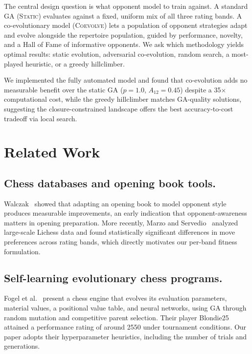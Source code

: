 \documentclass[conference]{IEEEtran}
\begin{document}
    The central design question is what opponent model to train against. A
    standard GA ({\scshape Static}) evaluates against a fixed, uniform mix of
    all three rating bands. A co-evolutionary model ({\scshape Coevolve}) lets
    a population of opponent strategies adapt and evolve alongside the repertoire
    population, guided by performance, novelty, and a Hall of Fame of informative
    opponents. We ask which methodology yields optimal results: static evolution,
    adversarial co-evolution, random search, a most-played heuristic, or a greedy
    hillclimber.

    We implemented the fully automated model and found that
    co-evolution adds no measurable benefit over the static GA ($p = 1.0$,
    $A_{12} = 0.45$) despite a 35$\times$ computational cost, while the greedy
    hillclimber matches GA-quality solutions, suggesting the closure-constrained
    landscape offers the best accuracy-to-cost tradeoff via local search.


\section{Related Work}
\subsection{Chess databases and opening book tools.}
Walczak~\cite{walczak1996} showed that adapting an opening book to model
opponent style produces measurable improvements, an early indication that
opponent-awareness matters in opening preparation. More recently, Marzo and
Servedio~\cite{marzo2023} analyzed large-scale Lichess data and found
statistically significant differences in move preferences across rating bands,
which directly motivates our per-band fitness formulation.

\subsection{Self-learning evolutionary chess programs.}

    Fogel et al.~\cite{fogel2004} present a chess engine that evolves its
    evaluation parameters, material values, a positional value table, and
    neural networks, using GA through random mutation and competitive parent
    selection. Their player Blondie25 attained a performance rating of around
    2550 under tournament conditions. Our paper adopts their hyperparameter
    heuristics, including the number of trials and generations.
\end{document}
